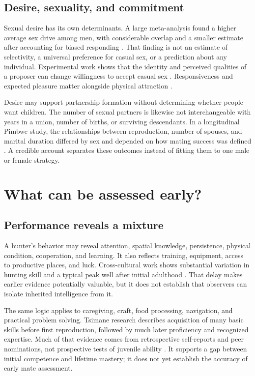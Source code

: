 \documentclass[10pt,twocolumn,letterpaper]{article}
\begin{document}
\subsection{Desire, sexuality, and commitment}
Sexual desire has its own determinants. A large meta-analysis found a higher average sex drive among men, with considerable overlap and a smaller estimate after accounting for biased responding \citep{sexdrive}. That finding is not an estimate of selectivity, a universal preference for casual sex, or a prediction about any individual. Experimental work shows that the identity and perceived qualities of a proposer can change willingness to accept casual sex \citep{conley,conley2014}. Responsiveness and expected pleasure matter alongside physical attraction \citep{birnbaum}.

Desire may support partnership formation without determining whether people want children. The number of sexual partners is likewise not interchangeable with years in a union, number of births, or surviving descendants. In a longitudinal Pimbwe study, the relationships between reproduction, number of spouses, and marital duration differed by sex and depended on how mating success was defined \citep{borgerhoffmulder2019}. A credible account separates these outcomes instead of fitting them to one male or female strategy.

\section{What can be assessed early?}
\subsection{Performance reveals a mixture}
A hunter's behavior may reveal attention, spatial knowledge, persistence, physical condition, cooperation, and learning. It also reflects training, equipment, access to productive places, and luck. Cross-cultural work shows substantial variation in hunting skill and a typical peak well after initial adulthood \citep{koster}. That delay makes earlier evidence potentially valuable, but it does not establish that observers can isolate inherited intelligence from it.

The same logic applies to caregiving, craft, food processing, navigation, and practical problem solving. Tsimane research describes acquisition of many basic skills before first reproduction, followed by much later proficiency and recognized expertise. Much of that evidence comes from retrospective self-reports and peer nominations, not prospective tests of juvenile ability \citep{schniter2015}. It supports a gap between initial competence and lifetime mastery; it does not yet establish the accuracy of early mate assessment.
\end{document}
